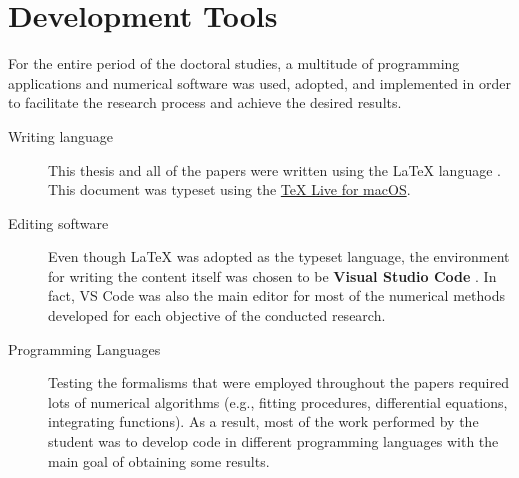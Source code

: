 \chapter{Development Tools}
\label{appendix:dev-tools}

For the entire period of the doctoral studies, a multitude of programming applications and numerical software was used, adopted, and implemented in order to facilitate the research process and achieve the desired results.

\begin{description}
    \item[Writing language] This thesis and all of the papers were written using the \LaTeX {} language \cite{lamport1986latex}. This document was typeset using the \href{https://tug.org/texlive/}{TeX Live for macOS}.
    \item[Editing software] Even though \LaTeX {} was adopted as the typeset language, the environment for writing the content itself was chosen to be \textbf{Visual Studio Code} \cite{vscode}. In fact, VS Code was also the main editor for most of the numerical methods developed for each objective of the conducted research.
    \item[Programming Languages] Testing the formalisms that were employed throughout the papers required lots of numerical algorithms (e.g., fitting procedures, differential equations, integrating functions). As a result, most of the work performed by the student was to develop code in different programming languages with the main goal of obtaining some results.
\end{description}


